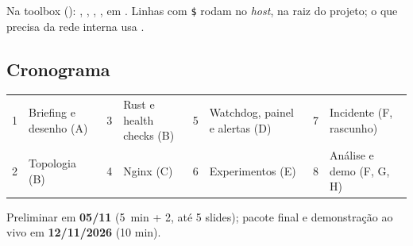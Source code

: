 Na toolbox (): , , ,
,  em . Linhas com \texttt{\$} rodam no \emph{host}, na raiz do
projeto; o que precisa da rede interna usa .

\subsection{Cronograma}

\begin{center}
\small
\begin{tabularx}{\linewidth}{@{}lXlXlXlX@{}}
1 & Briefing e desenho (A) & 3 & Rust e health checks (B) & 5 & Watchdog, painel e alertas (D) & 7 & Incidente (F, rascunho)\\
2 & Topologia (B) & 4 & Nginx (C) & 6 & Experimentos (E) & 8 & Análise e demo (F, G, H)\\
\end{tabularx}
\end{center}

Preliminar em \textbf{05/11} (5~min + 2, até 5 slides); pacote final e demonstração ao vivo em \textbf{12/11/2026} (10 min).
